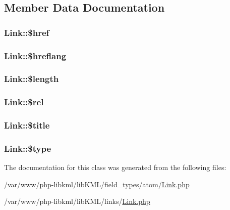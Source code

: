 \subsection{Member Data Documentation}
\hypertarget{classLink_a4aed0b1ffcdc484618ee1973ada5886a}{
\subsubsection[{\$href}]{\setlength{\rightskip}{0pt plus 5cm}Link::\$href}}
\label{d5/d19/classLink_a4aed0b1ffcdc484618ee1973ada5886a}
\hypertarget{classLink_aa495a887de4028796d8a021de4f8938f}{
\subsubsection[{\$hreflang}]{\setlength{\rightskip}{0pt plus 5cm}Link::\$hreflang}}
\label{d5/d19/classLink_aa495a887de4028796d8a021de4f8938f}
\hypertarget{classLink_a10717c65693beed06c455ee65625ed1f}{
\subsubsection[{\$length}]{\setlength{\rightskip}{0pt plus 5cm}Link::\$length}}
\label{d5/d19/classLink_a10717c65693beed06c455ee65625ed1f}
\hypertarget{classLink_ae49aa50eb6a44b056cef5ee95d3b5232}{
\subsubsection[{\$rel}]{\setlength{\rightskip}{0pt plus 5cm}Link::\$rel}}
\label{d5/d19/classLink_ae49aa50eb6a44b056cef5ee95d3b5232}
\hypertarget{classLink_a515fa90ecb9efca342d368d69d8e94cd}{
\subsubsection[{\$title}]{\setlength{\rightskip}{0pt plus 5cm}Link::\$title}}
\label{d5/d19/classLink_a515fa90ecb9efca342d368d69d8e94cd}
\hypertarget{classLink_a4423cdb53e4f02d175bb4a81e4d90ba5}{
\subsubsection[{\$type}]{\setlength{\rightskip}{0pt plus 5cm}Link::\$type}}
\label{d5/d19/classLink_a4423cdb53e4f02d175bb4a81e4d90ba5}


The documentation for this class was generated from the following files:\begin{DoxyCompactItemize}
\item 
/var/www/php-\/libkml/libKML/field\_\-types/atom/\hyperlink{field__types_2atom_2Link_8php}{Link.php}\item 
/var/www/php-\/libkml/libKML/links/\hyperlink{links_2Link_8php}{Link.php}\end{DoxyCompactItemize}
